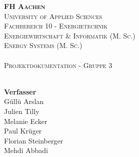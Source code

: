 \begin{titlepage}
  \thispagestyle{empty}
  
  \makebox[0pt][l]{
    \begin{picture}(50,50)
      \put(543, -155){
        \hfill
        \texttt{[image: ./images/fh-logo-right.pdf]} %
      }
    \end{picture}
  }

  \begin{center}

    {\huge \textsc{\textbf{FH Aachen}}}\\[0.2cm]
    {\Large \textsc{University of Applied Sciences}}\\[0.2cm]
    
    {\Large \textsc{Fachbereich 10 - Energietechnik}}\\[0.5cm]
    {\Large \textsc{Energiewirtschaft \& Informatik (M. Sc.)}}\\
    {\Large \textsc{Energy Systems (M. Sc.)}}\\[2cm]

    {\Huge \textsc{\textbf{\modulname}}}\\[0.5cm]
    {\Large \textsc{Projektdokumentation - Gruppe 3}}\\[0.2cm]
    {\textsc{\semester}}\\
  \end{center}


  \vspace{1cm}

  \noindent{}


  \vspace{1.5cm}

  \begin{center}
    {\Large \textbf{Verfasser}}\\[0.5cm]
    {\Large Güllü Arslan}\\[0.2cm]
    {\Large Julien Tilly}\\[0.2cm]
    {\Large Melanie Ecker}\\[0.2cm]
    {\Large Paul Krüger}\\[0.2cm]
    {\Large Florian Steinberger}\\[0.2cm]
    {\Large Mehdi Abbadi}\\


\end{center}
\end{titlepage}

